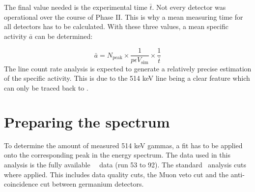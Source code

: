 \documentclass[encoding=utf8,british]{tumphthesis}
\begin{document}
The final value needed is the experimental time $\bar{t}$.
Not every detector was operational over the course of Phase II.
This is why a mean measuring time for all detectors has to be calculated.
With these three values, a mean specific activity $\bar{a}$ can be determined:

\begin{equation}
    \bar{a} = N_{\mathrm{peak}}\times\frac{1}{p \epsilon V_{\mathrm{sim}}}\times\frac{1}{\bar{t}}
    \label{equ:activityDieErste}
\end{equation}
The line count rate analysis is expected to generate a relatively precise estimation of the specific activity.
This is due to the 514 keV line being a clear feature which can only be traced back to \Kr.
\\

\section{Preparing the spectrum}

To determine the amount of measured 514 keV gammas, a fit has to be applied onto the corresponding peak in the energy spectrum.
The data used in this analysis is the fully available \gerda\ \PII\ data (run 53 to 92).
The standard \gerda\ analysis cuts where applied.
This includes data quality cuts, the Muon veto cut and the anti-coincidence cut between germanium detectors.
\\
\end{document}
